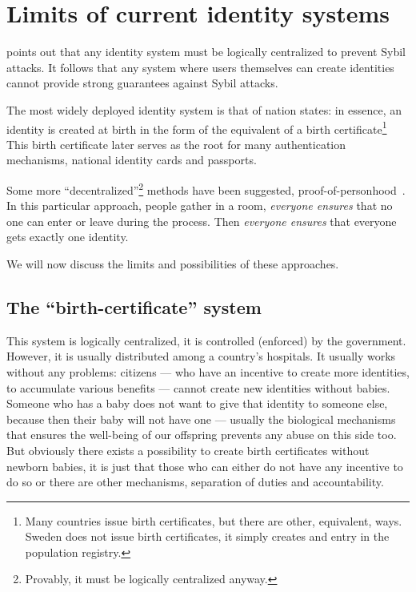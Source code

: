 \section{Limits of current identity systems}

\Textcite{SybilAttack} points out that any identity system must be logically 
centralized to prevent Sybil attacks.
It follows that any system where users themselves can create identities cannot 
provide strong guarantees against Sybil attacks.

The most widely deployed identity system is that of nation states: in essence, 
an identity is created at birth in the form of the equivalent of a birth 
certificate\footnote{%
  Many countries issue birth certificates, but there are other, equivalent, 
  ways.
  \Eg Sweden does not issue birth certificates, it simply creates and entry in 
  the population registry.
} This birth certificate later serves as the root for many authentication 
mechanisms, \eg national identity cards and passports.

Some more \enquote{decentralized}\footnote{%
  Provably, it must be logically centralized anyway.
} methods have been suggested, \eg 
proof-of-personhood~\cite{proof-of-personhood}.
In this particular approach, people gather in a room, \emph{everyone ensures} 
that no one can enter or leave during the process.
Then \emph{everyone ensures} that everyone gets exactly one identity.

We will now discuss the limits and possibilities of these approaches.

\subsection{The \enquote{birth-certificate} system}

This system is logically centralized, it is controlled (enforced) by the 
government.
However, it is usually distributed among a country's hospitals.
It usually works without any problems: citizens --- who have an incentive to 
create more identities, \eg to accumulate various benefits --- cannot create 
new identities without babies.
Someone who has a baby does not want to give that identity to someone else, 
because then their baby will not have one --- usually the biological mechanisms 
that ensures the well-being of our offspring prevents any abuse on this side 
too.
But obviously there exists a possibility to create birth certificates without 
newborn babies, it is just that those who can either do not have any incentive 
to do so or there are other mechanisms, \eg separation of duties and 
accountability.

